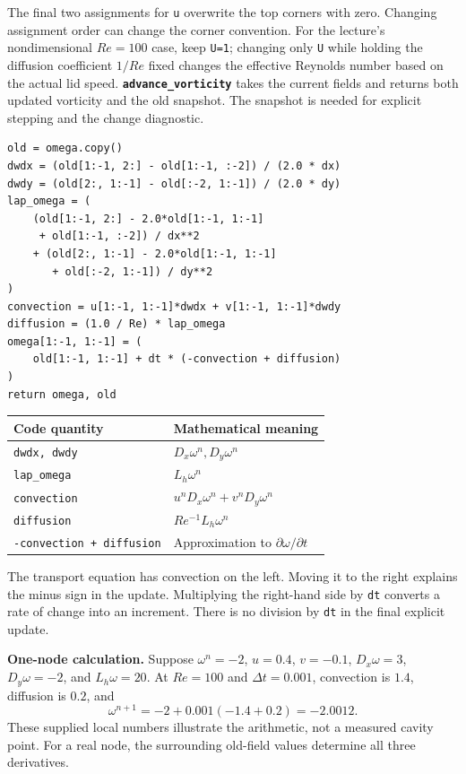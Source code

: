 The final two assignments for \texttt{u} overwrite the top corners with zero. Changing assignment order can change the corner convention. For the lecture's nondimensional $Re=100$ case, keep \texttt{U=1}; changing only \texttt{U} while holding the diffusion coefficient $1/Re$ fixed changes the effective Reynolds number based on the actual lid speed.
\newpage
{}
\textbf{\texttt{advance\_vorticity}} takes the current fields and returns both updated vorticity and the old snapshot. The snapshot is needed for explicit stepping and the change diagnostic.
\begin{lstlisting}
old = omega.copy()
dwdx = (old[1:-1, 2:] - old[1:-1, :-2]) / (2.0 * dx)
dwdy = (old[2:, 1:-1] - old[:-2, 1:-1]) / (2.0 * dy)
lap_omega = (
    (old[1:-1, 2:] - 2.0*old[1:-1, 1:-1]
     + old[1:-1, :-2]) / dx**2
    + (old[2:, 1:-1] - 2.0*old[1:-1, 1:-1]
       + old[:-2, 1:-1]) / dy**2
)
convection = u[1:-1, 1:-1]*dwdx + v[1:-1, 1:-1]*dwdy
diffusion = (1.0 / Re) * lap_omega
omega[1:-1, 1:-1] = (
    old[1:-1, 1:-1] + dt * (-convection + diffusion)
)
return omega, old
\end{lstlisting}
\begin{center}\begin{tabular}{ll}\toprule
Code quantity & Mathematical meaning\\\midrule
\texttt{dwdx, dwdy} & $D_x\omega^n, D_y\omega^n$\\
\texttt{lap\_omega} & $L_h\omega^n$\\
\texttt{convection} & $u^nD_x\omega^n+v^nD_y\omega^n$\\
\texttt{diffusion} & $Re^{-1}L_h\omega^n$\\
\texttt{-convection + diffusion} & Approximation to $\partial\omega/\partial t$\\\bottomrule
\end{tabular}\end{center}
The transport equation has convection on the left. Moving it to the right explains the minus sign in the update. Multiplying the right-hand side by \texttt{dt} converts a rate of change into an increment. There is no division by \texttt{dt} in the final explicit update.

\textbf{One-node calculation.} Suppose $\omega^n=-2$, $u=0.4$, $v=-0.1$, $D_x\omega=3$, $D_y\omega=-2$, and $L_h\omega=20$. At $Re=100$ and $\Delta t=0.001$, convection is $1.4$, diffusion is $0.2$, and
\[
\omega^{n+1}=-2+0.001(-1.4+0.2)=-2.0012.
\]
These supplied local numbers illustrate the arithmetic, not a measured cavity point. For a real node, the surrounding old-field values determine all three derivatives.


